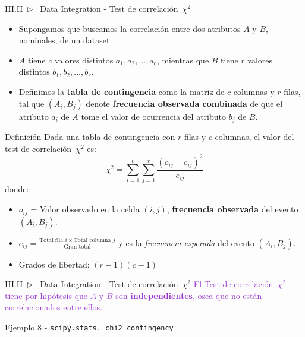 \documentclass[xcolor=dvipsnames]{beamer}
\begin{document}
    \begin{frame}{III.II~$\rhd$~ Data Integration - Test de correlación~$\chi^{2}$}
    \scriptsize{
        \begin{itemize}
            \item Supongamos que buscamos la correlación entre dos atributos $A$ y $B$, nominales, de un dataset.
            \item $A$ tiene $c$ valores distintos $a_{1},a_{2},...,a_{c}$, mientras que $B$ tiene $r$ valores distintos $b_{1},b_{2},...,b_{r}$.
            \item Definimos la \textbf{tabla de contingencia} como la matriz de $c$ columnas y $r$ filas, tal que $(A_{i}, B_{j})$ denote \textbf{frecuencia observada combinada} de que el atributo $a_{i}$ de $A$ tome el valor de ocurrencia del atributo $b_{j}$ de $B$.
        \end{itemize}
        \begin{block}{Definición}
        Dada una tabla de contingencia con $r$ filas y $c$ columnas, el valor del test de correlación~$\chi^{2}$ es:
        \[
        \chi^2 = \sum_{i=1}^{c}\sum_{j=1}^{r} \frac{(o_{ij} - e_{ij})^2}{e_{ij}}
        \]
        donde:
        \begin{itemize}
            \item $o_{ij}$ = Valor observado en la celda $(i,j)$, \textbf{frecuencia observada} del evento $(A_{i}, B_{j})$.
            \item $e_{ij} = \frac{\text{Total fila }i \times \text{Total columna }j}{\text{Gran total}}$ y es la \textit{frecuencia esperada} del evento $(A_{i}, B_{j})$. 
            \item Grados de libertad: $(r-1)(c-1)$
        \end{itemize}
        \end{block}
    }
    \end{frame}

    \begin{frame}{III.II~$\rhd$~ Data Integration - Test de correlación~$\chi^{2}$}
        \scriptsize{\textcolor{DarkOrchid}{El Test de correlación~$\chi^{2}$ tiene por hipótesis que $A$ y $B$ son \textbf{independientes}, osea que no están correlacionados entre ellos.}}
        \begin{exampleblock}{Ejemplo 8 - \texttt{scipy.stats. chi2\_contingency}}
            
            
            
        \end{exampleblock}
    \end{frame}
\end{document}
